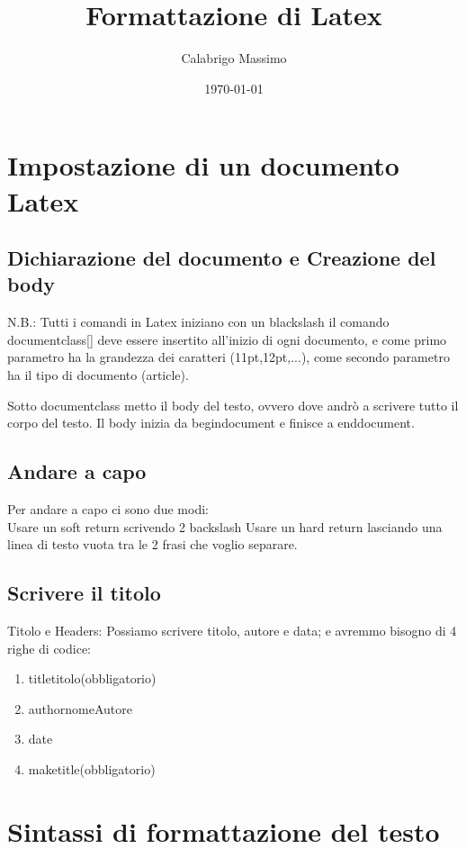 \documentclass[11pt]{article}
\begin{document}
\title{Formattazione di Latex}
\author{Calabrigo Massimo}
\date{\today}
\maketitle

\tableofcontents

\section{Impostazione di un documento Latex}
\subsection{Dichiarazione del documento e Creazione del body}
N.B.: Tutti i comandi in Latex iniziano con un blackslash
il comando documentclass[]{} deve essere insertito all'inizio di ogni documento,
e come primo parametro ha la grandezza dei caratteri (11pt,12pt,...),
come secondo parametro ha il tipo di documento (article).

Sotto documentclass metto il body del testo, ovvero dove andrò a scrivere tutto il corpo del testo. Il body inizia da begin{document} e finisce a end{document}.\\
\subsection{Andare a capo}
Per andare a capo ci sono due modi:\\
Usare un soft return scrivendo 2 backslash
Usare un hard return lasciando una linea di testo vuota tra le 2 frasi che voglio separare.\\
\subsection{Scrivere il titolo}
Titolo e Headers: Possiamo scrivere titolo, autore e data; e avremmo bisogno di 4 righe di codice:\\
\begin{enumerate}
    \item title{titolo}(obbligatorio)
    \item author{nomeAutore}
    \item date
    \item maketitle(obbligatorio)
\end{enumerate}
\section{Sintassi di formattazione del testo}
\end{document}
